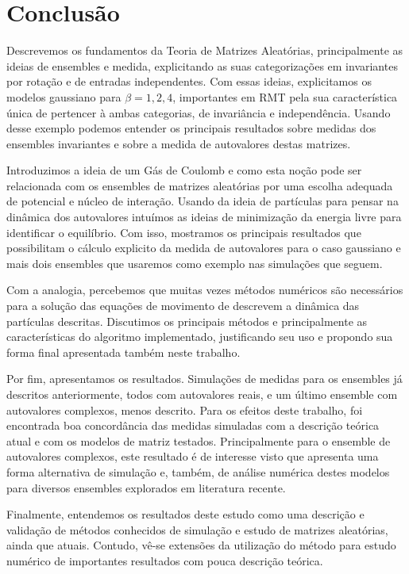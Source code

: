 \chapter{Conclusão}
\label{Capitulo: Conclusão}

Descrevemos os fundamentos da Teoria de Matrizes Aleatórias, principalmente as ideias de ensembles e medida, explicitando as suas categorizações em invariantes por rotação e de entradas independentes. Com essas ideias, explicitamos os modelos gaussiano para $\beta = 1,2,4$, importantes em RMT pela sua característica única de pertencer à ambas categorias, de invariância e independência. Usando desse exemplo podemos entender os principais resultados sobre medidas dos ensembles invariantes e sobre a medida de autovalores destas matrizes.
 
Introduzimos a ideia de um Gás de Coulomb e como esta noção pode ser relacionada com os ensembles de matrizes aleatórias por uma escolha adequada de potencial e núcleo de interação. Usando da ideia de partículas para pensar na dinâmica dos autovalores intuímos as ideias de minimização da energia livre para identificar o equilíbrio. Com isso, mostramos os principais resultados que possibilitam o cálculo explicito da medida de autovalores para o caso gaussiano e mais dois ensembles que usaremos como exemplo nas simulações que seguem.

Com a analogia, percebemos que muitas vezes métodos numéricos são necessários para a solução das equações de movimento de descrevem a dinâmica das partículas descritas. Discutimos os principais métodos e principalmente as características do algoritmo implementado, justificando seu uso e propondo sua forma final apresentada também neste trabalho.

Por fim, apresentamos os resultados. Simulações de medidas para os ensembles já descritos anteriormente, todos com autovalores reais, e um último ensemble com autovalores complexos, menos descrito. Para os efeitos deste trabalho, foi encontrada boa concordância das medidas simuladas com a descrição teórica atual e com os modelos de matriz testados. Principalmente para o ensemble de autovalores complexos, este resultado é de interesse visto que apresenta uma forma alternativa de simulação e, também, de análise numérica destes modelos para diversos ensembles explorados em literatura recente.

Finalmente, entendemos os resultados deste estudo como uma descrição e validação de métodos conhecidos de simulação e estudo de matrizes aleatórias, ainda que atuais. Contudo, vê-se extensões da utilização do método para estudo numérico de importantes resultados com pouca descrição teórica.
